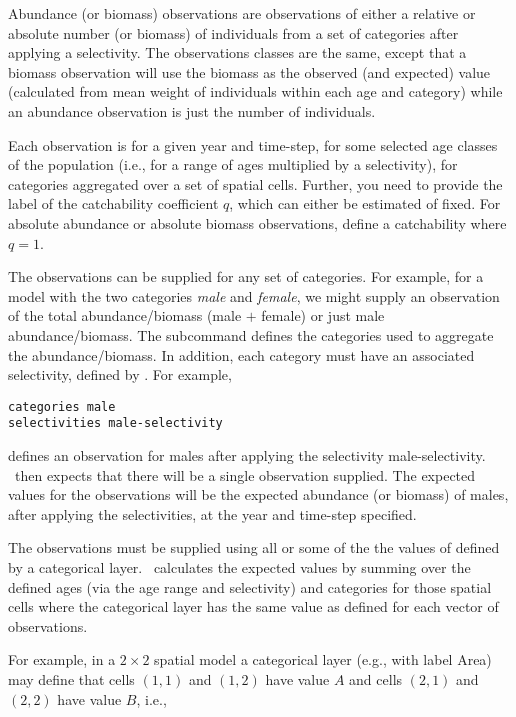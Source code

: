 {{{{{{Abundance (or biomass) observations are observations of either a relative or absolute number (or biomass) of individuals from a set of categories after applying a selectivity. The observations classes are the same, except that a biomass observation will use the biomass as the observed (and expected) value (calculated from mean weight of individuals within each age and category) while an abundance observation is just the number of individuals. 

Each observation is for a given year and time-step, for some selected age classes of the population (i.e., for a range of ages multiplied by a selectivity), for categories aggregated over a set of spatial cells. Further, you need to provide the label of the catchability coefficient $q$, which can either be estimated of fixed. For absolute abundance or absolute biomass observations, define a catchability where $q=1$.

The observations can be supplied for any set of categories. For example, for a model with the two categories \emph{male} and \emph{female}, we might supply an observation of the total abundance/biomass (male $+$ female) or just male abundance/biomass. The subcommand  defines the categories used to aggregate the abundance/biomass. In addition, each category must have an associated selectivity, defined by . For example,  

{\small{\begin{verbatim}
categories male
selectivities male-selectivity
\end{verbatim}}}

defines an observation for males after applying the selectivity male-selectivity. \SPM\ then expects that there will be a single observation supplied. The expected values for the observations will be the expected abundance (or biomass) of males, after applying the selectivities, at the year and time-step specified. 

The observations must be supplied using all or some of the the values of defined by a categorical layer. \SPM\ calculates the expected values by summing over the defined ages (via the age range and selectivity) and categories for those spatial cells where the categorical layer has the same value as defined for each vector of observations.

For example, in a $2 \times 2$ spatial model a categorical layer (e.g., with label Area) may define that cells $(1,1)$ and $(1,2)$ have value $A$ and cells $(2,1)$ and $(2,2)$ have value $B$, i.e.,

}}}}}}
